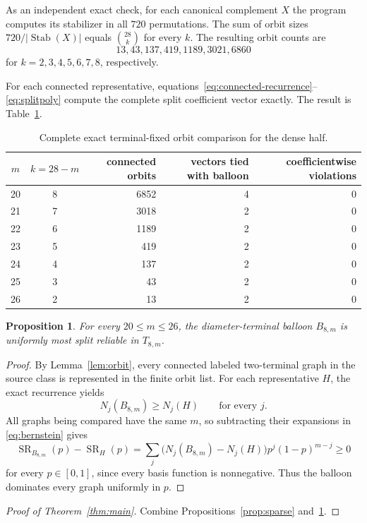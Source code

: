 \documentclass[11pt]{article}
\newtheorem{proposition}[theorem]{Proposition}
\newcommand{\SR}{\operatorname{SR}}
\begin{document}
As an independent exact check, for each canonical complement $X$ the program computes its stabilizer in all $720$ permutations. The sum of orbit sizes $720/|\operatorname{Stab}(X)|$ equals $\binom{28}{k}$ for every $k$. The resulting orbit counts are
\[
 13,43,137,419,1189,3021,6860
\]
for $k=2,3,4,5,6,7,8$, respectively.

For each connected representative, equations~\eqref{eq:connected-recurrence}--\eqref{eq:splitpoly} compute the complete split coefficient vector exactly. The result is Table~\ref{tab:dense}.

\begin{table}[h]
\centering
\begin{tabular}{c c r r r}
\toprule
$m$ & $k=28-m$ & connected orbits & vectors tied with balloon & coefficientwise violations\\
\midrule
20 & 8 & 6852 & 4 & 0\\
21 & 7 & 3018 & 2 & 0\\
22 & 6 & 1189 & 2 & 0\\
23 & 5 & 419 & 2 & 0\\
24 & 4 & 137 & 2 & 0\\
25 & 3 & 43 & 2 & 0\\
26 & 2 & 13 & 2 & 0\\
\bottomrule
\end{tabular}
\caption{Complete exact terminal-fixed orbit comparison for the dense half.}
\label{tab:dense}
\end{table}

\begin{proposition}\label{prop:dense}
For every $20\le m\le26$, the diameter-terminal balloon $B_{8,m}$ is uniformly most split reliable in $T_{8,m}$.
\end{proposition}
\begin{proof}
By Lemma~\ref{lem:orbit}, every connected labeled two-terminal graph in the source class is represented in the finite orbit list. For each representative $H$, the exact recurrence yields
\[
 N_j(B_{8,m})\ge N_j(H)\qquad\text{for every }j.
\]
All graphs being compared have the same $m$, so subtracting their expansions in \eqref{eq:bernstein} gives
\[
 \SR_{B_{8,m}}(p)-\SR_H(p)
 =\sum_j\bigl(N_j(B_{8,m})-N_j(H)\bigr)p^j(1-p)^{m-j}\ge0
\]
for every $p\in[0,1]$, since every basis function is nonnegative. Thus the balloon dominates every graph uniformly in $p$.
\end{proof}

\begin{proof}[Proof of Theorem~\ref{thm:main}]
Combine Propositions~\ref{prop:sparse} and~\ref{prop:dense}.
\end{proof}
\end{document}
